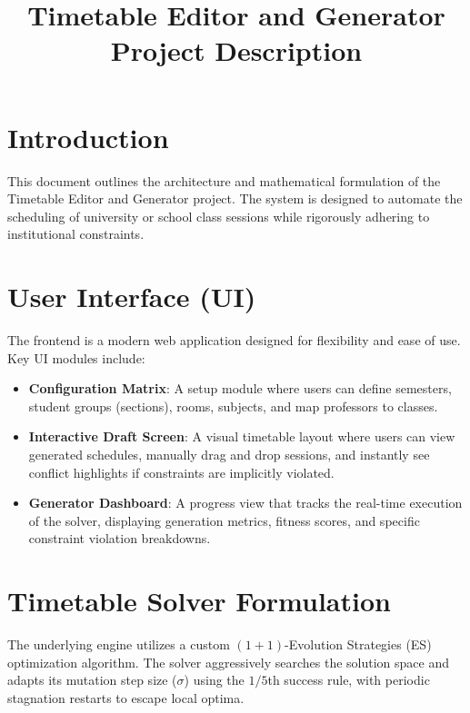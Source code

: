 \documentclass[11pt, a4paper]{article}
\title{Timetable Editor and Generator \\ \vspace{0.5em} \large Project Description}
\author{}
\date{}
\begin{document}
\maketitle

\section{Introduction}
This document outlines the architecture and mathematical formulation of the Timetable Editor and Generator project. The system is designed to automate the scheduling of university or school class sessions while rigorously adhering to institutional constraints.

\section{User Interface (UI)}
The frontend is a modern web application designed for flexibility and ease of use. Key UI modules include:
\begin{itemize}
    \item \textbf{Configuration Matrix}: A setup module where users can define semesters, student groups (sections), rooms, subjects, and map professors to classes.
    \item \textbf{Interactive Draft Screen}: A visual timetable layout where users can view generated schedules, manually drag and drop sessions, and instantly see conflict highlights if constraints are implicitly violated.
    \item \textbf{Generator Dashboard}: A progress view that tracks the real-time execution of the solver, displaying generation metrics, fitness scores, and specific constraint violation breakdowns.
\end{itemize}

\section{Timetable Solver Formulation}
The underlying engine utilizes a custom $(1+1)$-Evolution Strategies (ES) optimization algorithm. The solver aggressively searches the solution space and adapts its mutation step size ($\sigma$) using the $1/5$th success rule, with periodic stagnation restarts to escape local optima.
\end{document}
